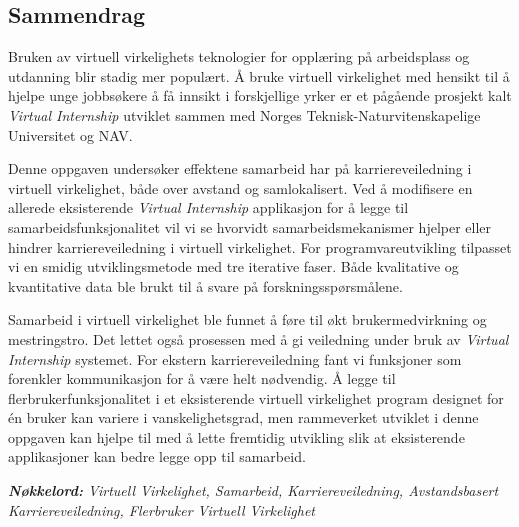 \begin{center}
\vspace*{1mm}
\section*{\Huge Sammendrag}
\vspace*{0.7cm}
\end{center}

Bruken av virtuell virkelighets teknologier for opplæring på arbeidsplass og utdanning blir stadig mer populært. Å bruke virtuell virkelighet med hensikt til å hjelpe unge jobbsøkere å få innsikt i forskjellige yrker er et pågående prosjekt kalt \textit{Virtual Internship} utviklet sammen med Norges Teknisk-Naturvitenskapelige Universitet og NAV.

Denne oppgaven undersøker effektene samarbeid har på karriereveiledning i virtuell virkelighet, både over avstand og samlokalisert. Ved å modifisere en allerede eksisterende \textit{Virtual Internship} applikasjon for å legge til samarbeidsfunksjonalitet vil vi se hvorvidt samarbeidsmekanismer hjelper eller hindrer karriereveiledning i virtuell virkelighet. For programvareutvikling tilpasset vi en smidig utviklingsmetode med tre iterative faser. Både kvalitative og kvantitative data ble brukt til å svare på forskningsspørsmålene. 

Samarbeid i virtuell virkelighet ble funnet å føre til økt brukermedvirkning og mestringstro. Det lettet også prosessen med å gi veiledning under bruk av \textit{ Virtual Internship } systemet. For ekstern karriereveiledning fant vi funksjoner som forenkler kommunikasjon for å være helt nødvendig. Å legge til flerbrukerfunksjonalitet i et eksisterende virtuell virkelighet program designet for én bruker kan variere i vanskelighetsgrad, men rammeverket utviklet i denne oppgaven kan hjelpe til med å lette fremtidig utvikling slik at eksisterende applikasjoner kan bedre legge opp til samarbeid.


\bigskip

\noindent \emph{\textbf{Nøkkelord:} Virtuell Virkelighet, Samarbeid, Karriereveiledning, Avstandsbasert Karriereveiledning, Flerbruker Virtuell Virkelighet}

\cleardoublepage